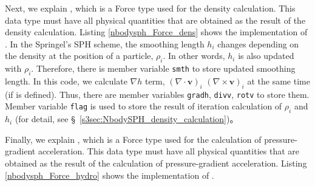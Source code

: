 \ifCpp %

\endifCpp
\ifFtn %

\endifFtn
\ifC %

\endifC


Next, we explain , which is a \textsf{Force} type used for the density calculation. This data type must have all physical quantities that are obtained as the result of the density calculation. Listing \ref{nbodysph_Force_dens} shows the implementation of . In the Springel's SPH scheme, the smoothing length $h_{i}$ changes depending on the density at the position of a particle, $\rho_{i}$. In other words, $h_{i}$ is also updated with $\rho_{i}$. Therefore, there is member variable \texttt{smth} to store updated smoothing length. In this code, we calculate $\nabla h$ term, $(\nabla\cdot\bm{v})_{i}$ $(\nabla\times\bm{v})_{i}$ at the same time (if  is defined). Thus, there are member variables \texttt{gradh}, \texttt{divv}, \texttt{rotv} to store them. Member variable \texttt{flag} is used to store the result of iteration calculation of $\rho_{i}$ and $h_{i}$ (for detail, see \S~\ref{s3sec:NbodySPH_density_calculation})。

\ifCpp %

\endifCpp
\ifFtn %

\endifFtn
\ifC %

\endifC


Finally, we explain , which is a \textsf{Force} type used for the calculation of pressure-gradient acceleration. This data type must have all physical quantities that are obtained as the result of the calculation of pressure-gradient acceleration. Listing \ref{nbodysph_Force_hydro} shows the implementation of .

